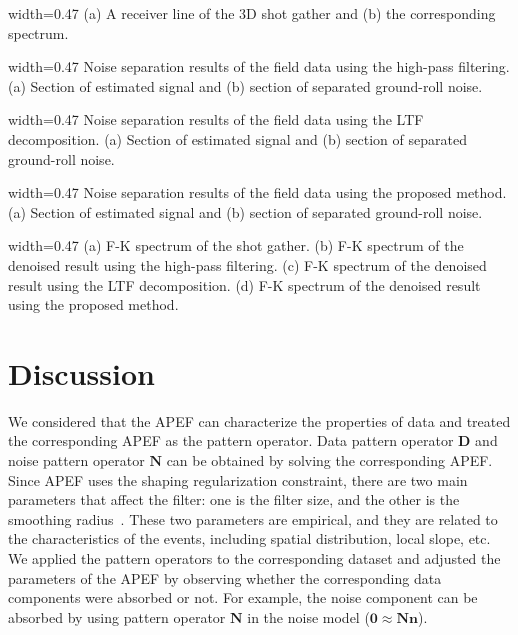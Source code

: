 {width=0.47\columnwidth}
{(a) A receiver line of the 3D shot gather and (b) the corresponding spectrum.}

{width=0.47\columnwidth}
{Noise separation results of the field data using the high-pass filtering.
    (a) Section of estimated signal and (b) section of separated ground-roll noise.}

{width=0.47\columnwidth}
{Noise separation results of the field data using the LTF decomposition.
    (a) Section of estimated signal and (b) section of separated ground-roll noise.}

{width=0.47\columnwidth}
{Noise separation results of the field data using the proposed method.
    (a) Section of estimated signal and (b) section of separated ground-roll noise.}

{width=0.47\columnwidth}
{   (a) F-K spectrum of the shot gather.
    (b) F-K spectrum of the denoised result using the high-pass filtering.
    (c) F-K spectrum of the denoised result using the LTF decomposition.
    (d) F-K spectrum of the denoised result using the proposed method.}

\section{Discussion}
We considered that the APEF can characterize the properties of data and
treated the corresponding APEF as the pattern operator. Data pattern
operator $\mathbf{D}$ and noise pattern operator $\mathbf{N}$ can be obtained
by solving the corresponding APEF. Since APEF uses the shaping regularization
constraint, there are two main parameters that affect the filter: one is the
filter size, and the other is the smoothing radius~\cite[]{Liu11}.
These two parameters are empirical, and they are related to the characteristics
of the events, including spatial distribution, local slope, etc. We applied the
pattern operators to the corresponding dataset and adjusted the parameters of
the APEF by observing whether the corresponding data components were absorbed or not.
For example, the noise component can be absorbed by using pattern operator
$\mathbf{N}$ in the noise model ($ \mathbf{0} \approx \mathbf{Nn} $).


